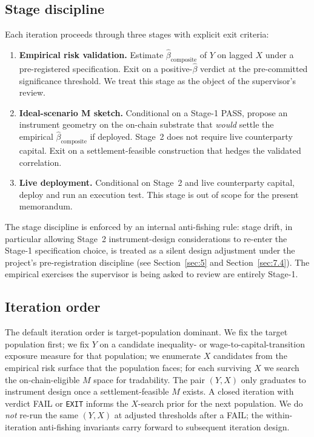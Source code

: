 \subsection{Stage discipline}

Each iteration proceeds through three stages with explicit exit criteria:

\begin{enumerate}
  \item \textbf{Empirical risk validation.} Estimate
    \(\hat{\beta}_{\mathrm{composite}}\) of \(Y\) on lagged \(X\) under a
    pre-registered specification. Exit on a positive-\(\hat{\beta}\)
    verdict at the pre-committed significance threshold. We treat this
    stage as the object of the supervisor's review.
  \item \textbf{Ideal-scenario M sketch.} Conditional on a Stage-1 PASS,
    propose an instrument geometry on the on-chain substrate that
    \emph{would} settle the empirical \(\hat{\beta}_{\mathrm{composite}}\) if
    deployed. Stage~2 does not require live counterparty capital. Exit on
    a settlement-feasible construction that hedges the validated
    correlation.
  \item \textbf{Live deployment.} Conditional on Stage~2 and live
    counterparty capital, deploy and run an execution test. This stage is
    out of scope for the present memorandum.
\end{enumerate}

The stage discipline is enforced by an internal anti-fishing rule: stage
drift, in particular allowing Stage~2 instrument-design considerations to
re-enter the Stage-1 specification choice, is treated as a silent design
adjustment under the project's pre-registration discipline (see
Section~\ref{sec:5} and Section~\ref{sec:7.4}). The empirical exercises
the supervisor is being asked to review are entirely Stage-1.

\subsection{Iteration order}

The default iteration order is target-population dominant. We fix the
target population first; we fix \(Y\) on a candidate
inequality- or wage-to-capital-transition exposure measure for that
population; we enumerate \(X\) candidates from the empirical risk surface
that the population faces; for each surviving \(X\) we search the
on-chain-eligible \(M\) space for tradability. The pair \((Y, X)\) only
graduates to instrument design once a settlement-feasible \(M\) exists. A
closed iteration with verdict FAIL or \texttt{EXIT} informs the
\(X\)-search prior for the next population. We do \emph{not} re-run the
same \((Y, X)\) at adjusted thresholds after a FAIL; the within-iteration
anti-fishing invariants carry forward to subsequent iteration design.

